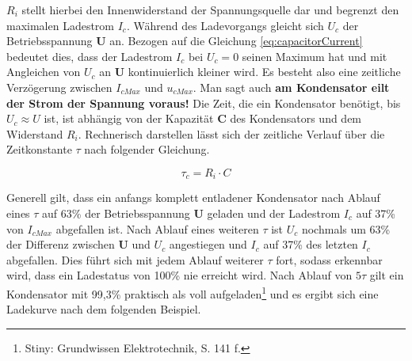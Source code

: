 {{\noindent \(R_i\) stellt hierbei den Innenwiderstand der Spannungsquelle dar und begrenzt den maximalen Ladestrom \(I_c\). Während des Ladevorgangs gleicht sich \(U_c\) der Betriebsspannung \textbf{U} an. Bezogen auf die Gleichung \eqref{eq:capacitorCurrent} bedeutet dies, dass der Ladestrom \(I_c\) bei \(U_c = 0\) seinen Maximum hat und mit Angleichen von \(U_c\) an \textbf{U} kontinuierlich kleiner wird. Es besteht also eine zeitliche Verzögerung zwischen \(I_{cMax}\) und \(u_{cMax}\). Man sagt auch \textbf{am Kondensator eilt der Strom der Spannung voraus!} Die Zeit, die ein Kondensator benötigt, bis \(U_c \approx U\) ist, ist abhängig von der Kapazität \textbf{C} des Kondensators und dem Widerstand \(R_i\). Rechnerisch darstellen lässt sich der zeitliche Verlauf über die Zeitkonstante \(\tau\) nach folgender Gleichung.

\begin{equation}
  \tau_c = R_i \cdot C
  \label{eq:tauCapacitor}
\end{equation}

\noindent Generell gilt, dass ein anfangs komplett entladener Kondensator nach Ablauf eines \(\tau \) auf 63\% der Betriebsspannung \textbf{U} geladen und der Ladestrom \(I_c\) auf 37\% von \(I_{cMax}\) abgefallen ist. Nach Ablauf eines weiteren \(\tau \) ist \(U_c\) nochmals um 63\% der Differenz zwischen \textbf{U} und \(U_c\) angestiegen und \(I_c\) auf 37\% des letzten \(I_c\) abgefallen. Dies führt sich mit jedem Ablauf weiterer \(\tau \) fort, sodass erkennbar wird, dass ein Ladestatus von 100\% nie erreicht wird. Nach Ablauf von \(5\tau \) gilt ein Kondensator mit 99,3\% praktisch als voll aufgeladen\footnote{Stiny: Grundwissen Elektrotechnik, S. 141 f.} und es ergibt sich eine Ladekurve nach dem folgenden Beispiel. 

\clearpage

}}
